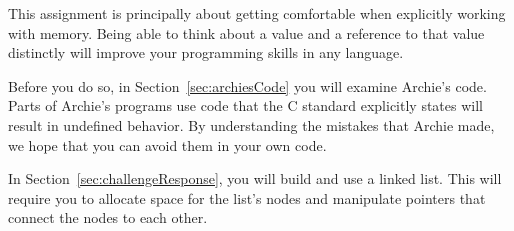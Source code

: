 This assignment is principally about getting comfortable when explicitly working with memory.
Being able to think about a value and a reference to that value distinctly will improve your programming skills in any language.

Before you do so, in Section~\ref{sec:archiesCode} you will examine Archie's code.
Parts of Archie's programs use code that the C standard explicitly states will result in undefined behavior.
By understanding the mistakes that Archie made, we hope that you can avoid them in your own code.

In Section~\ref{sec:challengeResponse}, you will build and use a linked list.
This will require you to allocate space for the list's nodes and manipulate pointers that connect the nodes to each other.

